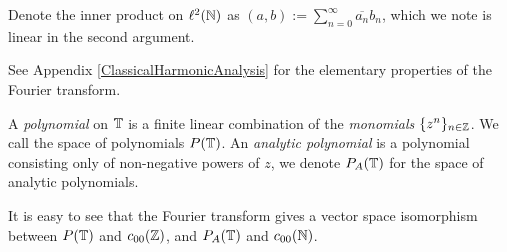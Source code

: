 Denote the inner product on $\ell^2(\mathbb{N})$ 
as $(a,b) := \sum_{n=0}^\infty \overline{a_n}b_n$, which we note
is linear in the second argument.

See Appendix \ref{ClassicalHarmonicAnalysis} for the elementary properties of the Fourier transform. 

A \emph{polynomial} on $\mathbb{T}$ is a finite linear combination of the \emph{monomials}
$\{z^n\}_{n \in \mathbb{Z}}$. We call the space of polynomials $P(\mathbb{T})$.
An \emph{analytic polynomial} is a polynomial consisting only of non-negative powers
of $z$, we denote $P_A(\mathbb{T})$ for the space of analytic polynomials. 

It is easy to see that the Fourier transform gives a vector space isomorphism between $P(\mathbb{T})$
and $c_{00}(\mathbb{Z})$, and $P_A(\mathbb{T})$ and $c_{00}(\mathbb{N})$.

